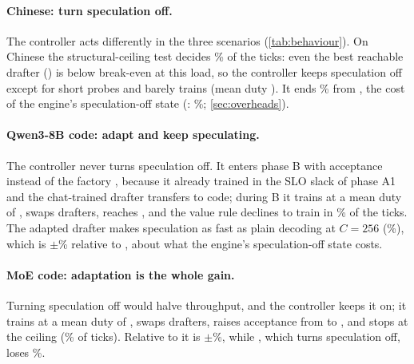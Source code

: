 \begin{table}[t]
\caption{Phase-B throughput of  with one test removed, relative to  (paired mean $\pm$ sd over three repetitions, \%).}
\label{tab:ablate}
\centering\small\setlength{\tabcolsep}{4pt}
\end{table}

\paragraph{Chinese: turn speculation off.} The controller acts differently in the three scenarios (\cref{tab:behaviour}). On Chinese the structural-ceiling test decides \% of the ticks: even the best reachable drafter () is below break-even at this load, so the controller keeps speculation off except for short probes and barely trains (mean duty ). It ends \% from , the cost of the engine's speculation-off state (: \%; \cref{sec:overheads}).

\paragraph{Qwen3-8B code: adapt and keep speculating.} The controller never turns speculation off. It enters phase B with acceptance  instead of the factory , because it already trained in the SLO slack of phase A1 and the chat-trained drafter transfers to code; during B it trains at a mean duty of , swaps  drafters, reaches , and the value rule declines to train in \% of the ticks. The adapted drafter makes speculation as fast as plain decoding at $C{=}256$ (\%), which is $\pm$\% relative to , about what the engine's speculation-off state costs.

\paragraph{MoE code: adaptation is the whole gain.} Turning speculation off would halve throughput, and the controller keeps it on; it trains at a mean duty of , swaps  drafters, raises acceptance from  to , and stops at the ceiling (\% of ticks). Relative to  it is $\pm$\%, while , which turns speculation off, loses \%.

